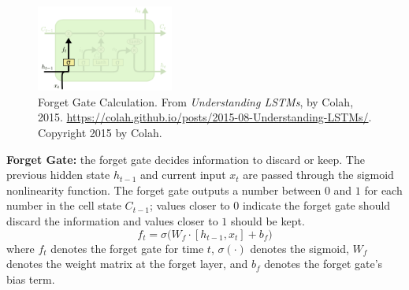 \begin{program}
\begin{figure}
\vspace{5pt}
\centering
\includegraphics[width=0.4\textwidth]{imgs/lstm_forgetGate.png}
\vspace{-20pt}
\caption{\footnotesize Forget Gate Calculation. From \emph{Understanding LSTMs}, by Colah, 2015. \url{https://colah.github.io/posts/2015-08-Understanding-LSTMs/}. Copyright 2015 by Colah.}
\vspace{5pt}
\end{figure}
\textbf{Forget Gate: } the forget gate decides information to discard or keep. The previous hidden state $h_{t-1}$ and current input $x_t$ are passed through the sigmoid nonlinearity function. The forget gate outputs a number between $0$ and $1$ for each number in the cell state $C_{t-1}$; values closer to $0$ indicate the forget gate should discard the information and values closer to $1$ should be kept. 
$$
f_t = \sigma \Big( W_f \cdot [h_{t-1}, x_t] + b_f \Big)
$$
where $f_t$ denotes the forget gate for time $t$, $\sigma(\cdot)$ denotes the sigmoid, $W_f$ denotes the weight matrix at the forget layer, and $b_f$ denotes the forget gate's bias term. 
\end{program}


